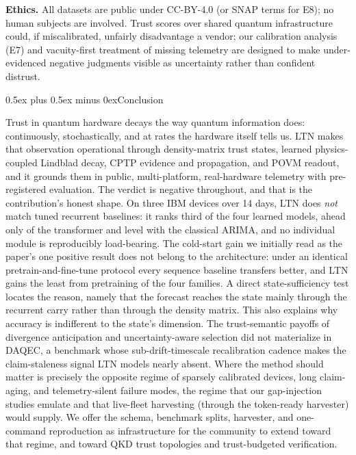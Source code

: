 \documentclass[journal]{IEEEtran}
\makeatletter
\def\section{\@startsection{section}{1}{\z@}{1.8ex plus 1ex minus 0.75ex}%
{0.5ex plus 0.5ex minus 0ex}{\normalfont\normalsize\centering\scshape}}
\makeatother
\begin{document}
\textbf{Ethics.} All datasets are public under CC-BY-4.0 (or SNAP terms for E8);
no human subjects are involved. Trust scores over shared quantum infrastructure could,
if miscalibrated, unfairly disadvantage a vendor; our calibration analysis (E7) and
vacuity-first treatment of missing telemetry are designed to make under-evidenced
negative judgments visible as uncertainty rather than confident distrust.

\section{Conclusion}\label{sec:conclusion}

Trust in quantum hardware decays the way quantum information does: continuously,
stochastically, and at rates the hardware itself tells us. LTN makes that
observation operational through density-matrix trust states, learned physics-coupled
Lindblad decay, CPTP evidence and propagation, and POVM readout, and it grounds them
in public, multi-platform, real-hardware telemetry with pre-registered evaluation.
The verdict is negative throughout, and that is the contribution's honest shape.
On three IBM devices over 14 days, LTN does \emph{not} match tuned recurrent
baselines: it ranks third of the four learned models, ahead only of the transformer and
level with the classical ARIMA, and no individual module is reproducibly
load-bearing. The cold-start gain we initially read
as the paper's one positive result does not belong to the architecture: under an
identical pretrain-and-fine-tune protocol every sequence baseline transfers better, and
LTN gains the least from pretraining of the four families. A direct state-sufficiency
test locates the reason, namely that the forecast reaches the state mainly through the
recurrent carry rather than through the density matrix. This also explains why accuracy
is indifferent to the state's dimension. The trust-semantic payoffs of
divergence anticipation and uncertainty-aware selection did not materialize in DAQEC,
a benchmark whose sub-drift-timescale recalibration cadence makes the claim-staleness
signal LTN models nearly absent. Where the method should matter is precisely the
opposite regime of sparsely calibrated devices, long claim-aging, and telemetry-silent
failure modes, the regime that our gap-injection studies emulate and that live-fleet
harvesting (through the token-ready harvester) would supply. We offer the schema,
benchmark splits, harvester, and one-command reproduction as infrastructure for the
community to extend toward that regime, and toward QKD trust topologies and
trust-budgeted verification.
\end{document}
